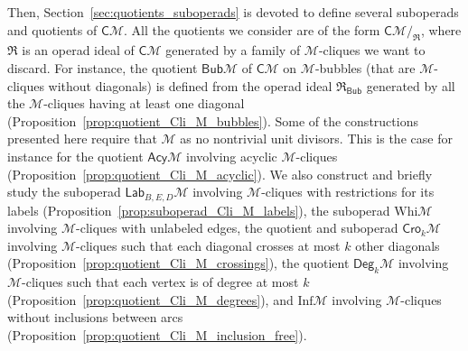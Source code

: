 \documentclass[10pt,reqno]{amsart}
\numberwithin{equation}{subsection}
\newcommand{\Mca}{\mathcal{M}}
\newcommand{\Cli}{\mathsf{C}}
\newcommand{\Lab}{\mathsf{Lab}}
\newcommand{\Bub}{\mathsf{Bub}}
\newcommand{\Deg}{\mathsf{Deg}}
\newcommand{\Cro}{\mathsf{Cro}}
\newcommand{\Acy}{\mathsf{Acy}}
\newcommand{\Whi}{\mathrm{Whi}}
\newcommand{\Inf}{\mathrm{Inf}}
\newcommand{\Rel}{\mathfrak{R}}
\begin{document}
Then, Section~\ref{sec:quotients_suboperads} is devoted to define
several suboperads and quotients of $\Cli\Mca$. All the quotients we
consider are of the form $\Cli\Mca/_{\Rel}$, where $\Rel$ is an operad
ideal of $\Cli\Mca$ generated by a family of $\Mca$-cliques we want to
discard. For instance, the quotient $\Bub\Mca$ of $\Cli\Mca$ on
$\Mca$-bubbles (that are $\Mca$-cliques without diagonals) is defined
from the operad ideal $\Rel_{\Bub}$ generated by all the $\Mca$-cliques
having at least one diagonal
(Proposition~\ref{prop:quotient_Cli_M_bubbles}). Some of the
constructions presented here require that $\Mca$ as no nontrivial unit
divisors. This is the case for instance for the quotient $\Acy\Mca$
involving acyclic $\Mca$-cliques
(Proposition~\ref{prop:quotient_Cli_M_acyclic}). We also construct and
briefly study the suboperad $\Lab_{B, E, D}\Mca$ involving
$\Mca$-cliques with restrictions for its labels
(Proposition~\ref{prop:suboperad_Cli_M_labels}), the suboperad
$\Whi\Mca$ involving $\Mca$-cliques with unlabeled edges, the quotient
and suboperad $\Cro_k\Mca$ involving $\Mca$-cliques such that each
diagonal crosses at most $k$ other diagonals
(Proposition~\ref{prop:quotient_Cli_M_crossings}), the quotient
$\Deg_k\Mca$ involving $\Mca$-cliques such that each vertex is of degree
at most $k$ (Proposition~\ref{prop:quotient_Cli_M_degrees}), and
$\Inf\Mca$ involving $\Mca$-cliques without inclusions between arcs
(Proposition~\ref{prop:quotient_Cli_M_inclusion_free}).
\smallskip
\end{document}
